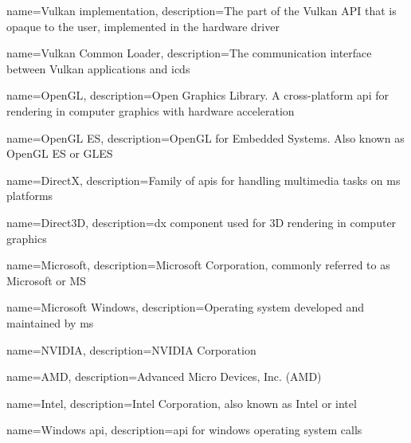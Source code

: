 {
  name={Vulkan implementation},
  description={The part of the Vulkan API that is opaque to the user, implemented in the hardware driver}
}

{
  name={Vulkan Common Loader},
  description={The communication interface between Vulkan applications and \glspl{icd}}
}

{
  name={OpenGL},
  description={Open Graphics Library. A cross-platform \gls{api} for rendering in computer graphics with hardware acceleration}
}

{
  name={OpenGL ES},
  description={OpenGL for Embedded Systems. Also known as OpenGL ES or GLES}
}

{
  name={DirectX},
  description={Family of \glspl{api} for handling multimedia tasks on \acrfull{ms} platforms}
}

{
  name={Direct3D},
  description={\gls{dx} component used for 3D rendering in computer graphics}
}

{
  name={Microsoft},
  description={Microsoft Corporation, commonly referred to as Microsoft or MS}
}

{
  name={Microsoft Windows},
  description={Operating system developed and maintained by \gls{ms}}
}

{
  name={NVIDIA},
  description={NVIDIA Corporation}
}

{
  name={AMD},
  description={Advanced Micro Devices, Inc. (AMD)}
}

{
  name={Intel},
  description={Intel Corporation, also known as Intel or intel}
}

{
  name={Windows \gls{api}},
  description={\gls{api} for \gls{windows} operating system calls}
}
